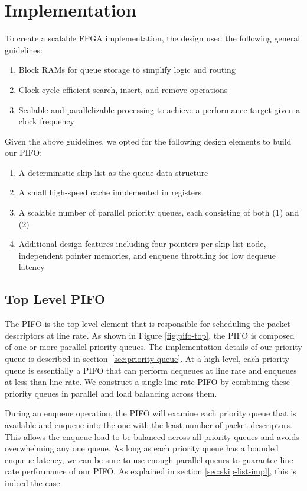 \section{Implementation}

To create a scalable FPGA implementation, the design used the following general guidelines:

\begin{enumerate}
    \item Block RAMs for queue storage to simplify logic and routing
    \item Clock cycle-efficient search, insert, and remove operations 
    \item Scalable and parallelizable processing to achieve a performance target given a clock frequency
\end{enumerate}

Given the above guidelines, we opted for the following design elements to build our PIFO:
\begin{enumerate}
    \item A deterministic skip list as the queue data structure
    \item A small high-speed cache implemented in registers
    \item A scalable number of parallel priority queues, each consisting of both (1) and (2)
    \item Additional design features including four pointers per skip list node, independent pointer memories, and enqueue throttling for low dequeue latency
\end{enumerate}

\subsection{Top Level PIFO}\label{sec:pifo}

The PIFO is the top level element that is responsible for scheduling the packet descriptors at line rate. As shown in Figure \ref{fig:pifo-top}, the PIFO is composed of one or more parallel priority queues. The implementation details of our priority queue is described in section~\ref{sec:priority-queue}. At a high level, each priority queue is essentially a PIFO that can perform dequeues at line rate and enqueues at less than line rate. We construct a single line rate PIFO by combining these priority queues in parallel and load balancing across them.

During an enqueue operation, the PIFO will examine each priority queue that is available and enqueue into the one with the least number of packet descriptors. This allows the enqueue load to be balanced across all priority queues and avoids overwhelming any one queue. As long as each priority queue has a bounded enqueue latency, we can be sure to use enough parallel queues to guarantee line rate performance of our PIFO. As explained in section \ref{sec:skip-list-impl}, this is indeed the case.

